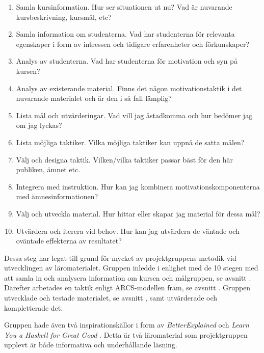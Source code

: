 \documentclass[12pt,a4paper,twoside,openright]{article}
\begin{document}
\begin{enumerate}
\item Samla kursinformation. Hur ser situationen ut nu? Vad är
  nuvarande kursbeskrivning, kursmål, etc?

\item Samla information om studenterna. Vad har studenterna för
  relevanta egenskaper i form av intressen och tidigare erfarenheter
  och förkunskaper?

\item Analys av studenterna. Vad har studenterna för motivation och
  syn på kursen?

\item Analys av existerande material. Finns det någon
  motivationstaktik i det nuvarande materialet och är den i så fall
  lämplig?

\item Lista mål och utvärderingar. Vad vill jag åstadkomma och hur
  bedömer jag om jag lyckas?

\item Lista möjliga taktiker. Vilka möjliga taktiker kan uppnå de
  satta målen?

\item Välj och designa taktik. Vilken/vilka taktiker passar bäst för
  den här publiken, ämnet etc.

\item Integrera med instruktion. Hur kan jag kombinera
  motivationskomponenterna med ämnesinformationen?

\item Välj och utveckla material. Hur hittar eller skapar jag material
  för dessa mål?

\item Utvärdera och iterera vid behov. Hur kan jag utvärdera de
  väntade och oväntade effekterna av resultatet?

\end{enumerate}

Dessa steg har legat till grund för mycket av projektgruppens metodik
vid utvecklingen av läromaterialet. Gruppen inledde i enlighet med de
10 stegen med att samla in och analysera information om kursen och
målgruppen, se avsnitt . Därefter
arbetades en taktik enligt ARCS-modellen fram, se avsnitt
. Gruppen utvecklade och testade materialet,
se avsnitt , samt utvärderade och kompletterade
det.

Gruppen hade även två inspirationskällor i form av
\textit{BetterExplained} \cite{betterexplained} och \textit{Learn You
  a Haskell for Great Good} \cite{learnyouahaskell}. Detta är två
läromaterial som projektgruppen upplevt är både informativa och
underhållande läsning.
\end{document}
